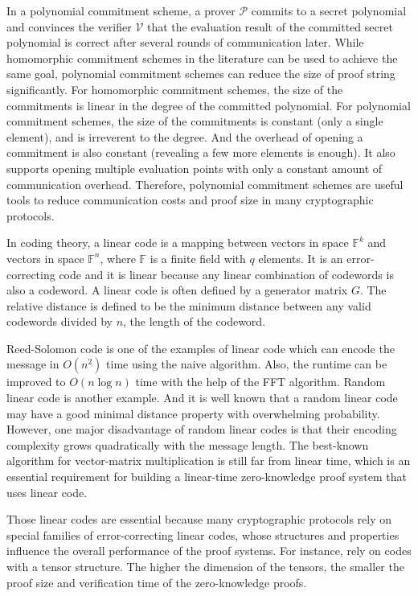 In a polynomial commitment scheme, a prover $\mathcal{P}$ commits to a secret polynomial and convinces the verifier $\mathcal{V}$ that the evaluation result of the committed secret polynomial is correct after several rounds of communication later. 
While homomorphic commitment schemes in the literature can be used to achieve the same goal, polynomial commitment schemes can reduce the size of proof string significantly. For homomorphic commitment schemes, the size of the commitments is linear in the degree of the committed polynomial. For polynomial commitment schemes, the size of the commitments is constant (only a single element), and is irreverent to the degree. And the overhead of opening a commitment is also constant (revealing a few more elements is enough). It also supports opening multiple evaluation points with only a constant amount of communication overhead. Therefore, polynomial commitment schemes are useful tools to reduce communication costs and proof size in many cryptographic protocols.



In coding theory, a linear code is a mapping between vectors in space $\mathbb{F}^k$ and vectors in space $\mathbb{F}^n$, where $\mathbb{F}$ is a finite field with $q$ elements. It is an error-correcting code and it is linear because any linear combination of codewords is also a codeword. A linear code is often defined by a generator matrix $G$. The relative distance is defined to be the minimum distance between any valid codewords divided by $n$, the length of the codeword. 

Reed-Solomon code is one of the examples of linear code which can encode the message in $O(n^2)$ time using the naive algorithm. Also, the runtime can be improved to $O(n \log n)$ time with the help of the FFT algorithm. Random linear code is another example. And it is well known that a random linear code may have a good minimal distance property with overwhelming probability. However, one major disadvantage of random linear codes is that their encoding complexity grows quadratically with the message length. The best-known algorithm for vector-matrix multiplication is still far from linear time, which is an essential requirement for building a linear-time zero-knowledge proof system that uses linear code.

Those linear codes are essential because many cryptographic protocols rely on special families of error-correcting linear codes, whose structures and properties influence the overall performance of the proof systems. For instance, \cite{brakedown} \cite{cryptoeprint:2020/1426} \cite{BCL22} rely on codes with a tensor structure. The higher the dimension of the tensors, the smaller the proof size and verification time of the zero-knowledge proofs.

